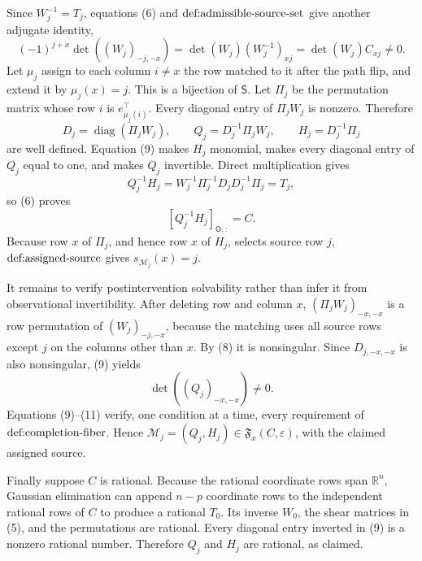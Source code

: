 Since \(W_j^{-1}=T_j\), equations (6) and \(\textnormal{def:admissible-source-set}\) give another adjugate identity,
\[
 (-1)^{j+x}\det((W_j)_{-j,-x})
 =\det(W_j)(W_j^{-1})_{xj}
 =\det(W_j)C_{xj}\ne0.                                                      \tag{8}
\]
Let \(\mu_j\) assign to each column \(i\ne x\) the row matched to it after the path flip, and extend it by \(\mu_j(x)=j\).  This is a bijection of \(\mathsf S\).  Let \(\Pi_j\) be the permutation matrix whose row \(i\) is \(e_{\mu_j(i)}^\top\).  Every diagonal entry of \(\Pi_jW_j\) is nonzero.  Therefore
\[
 D_j=\operatorname{diag}(\Pi_jW_j),\qquad
 Q_j=D_j^{-1}\Pi_jW_j,\qquad
 H_j=D_j^{-1}\Pi_j                                                       \tag{9}
\]
are well defined.  Equation (9) makes \(H_j\) monomial, makes every diagonal entry of \(Q_j\) equal to one, and makes \(Q_j\) invertible.  Direct multiplication gives
\[
 Q_j^{-1}H_j
 =W_j^{-1}\Pi_j^{-1}D_jD_j^{-1}\Pi_j
 =T_j,
\]
so (6) proves
\[
 [Q_j^{-1}H_j]_{\mathsf O,:}=C.                                            \tag{10}
\]
Because row \(x\) of \(\Pi_j\), and hence row \(x\) of \(H_j\), selects source row \(j\), \(\textnormal{def:assigned-source}\) gives \(s_{\mathcal M_j}(x)=j\).

It remains to verify postintervention solvability rather than infer it from observational invertibility.  After deleting row and column \(x\), \((\Pi_jW_j)_{-x,-x}\) is a row permutation of \((W_j)_{-j,-x}\), because the matching uses all source rows except \(j\) on the columns other than \(x\).  By (8) it is nonsingular.  Since \(D_{j,-x,-x}\) is also nonsingular, (9) yields
\[
 \det((Q_j)_{-x,-x})\ne0.                                                   \tag{11}
\]
Equations (9)--(11) verify, one condition at a time, every requirement of \(\textnormal{def:completion-fiber}\).  Hence \(\mathcal M_j=(Q_j,H_j)\in\mathfrak F_x(C,\varepsilon)\), with the claimed assigned source.

Finally suppose \(C\) is rational.  Because the rational coordinate rows span \(\mathbb R^n\), Gaussian elimination can append \(n-p\) coordinate rows to the independent rational rows of \(C\) to produce a rational \(T_0\).  Its inverse \(W_0\), the shear matrices in (5), and the permutations are rational.  Every diagonal entry inverted in (9) is a nonzero rational number.  Therefore \(Q_j\) and \(H_j\) are rational, as claimed.